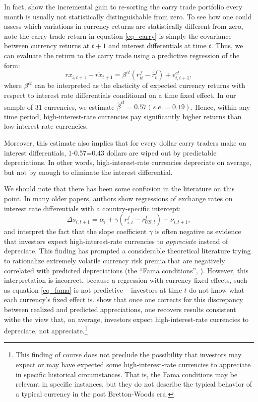 \documentclass{ar-1col}
\begin{document}
In fact, \citet{HassanMano2019} show the incremental gain to re-sorting the carry trade portfolio every month is usually not statistically distinguishable from zero. To see how one could assess which variations in currency returns are statistically different from zero, note the carry trade return in equation \ref{eq_carry} is simply the covariance between currency returns at $t+1$ and interest differentials at time $t$. Thus, we can evaluate the return to the carry trade using a predictive regression of the form:
\begin{equation}
    rx_{i,t+1} - \overline{rx}_{t+1} 
    = \beta^{ct}\left( r^f_{it}-\overline{r}^f_{t}\right) +\epsilon_{i,t+1}^{ct},  \label{eq_ct}
\end{equation} 
where $\beta ^{ct}$ can be interpreted as the elasticity of expected currency returns with respect to interest rate differentials conditional on a time fixed effect. In our sample of 31 currencies, we estimate $\hat{\beta}^{ct}=0.57 (s.e.=0.19)$. Hence, within any time period, high-interest-rate currencies pay significantly higher returns than low-interest-rate currencies.

Moreover, this estimate also implies that for every dollar carry traders make on interest differentials, 1-0.57=0.43 dollars are wiped out by predictable depreciations. In other words, high-interest-rate currencies depreciate on average, but not by enough to eliminate the interest differential.

We should note that there has been some confusion in the literature on this point. In many older papers, authors show regressions of exchange rates on interest rate differentials with a country-specific intercept:
\begin{equation}
    \Delta s_{i,t+1} 
    = \alpha_i + \gamma \left(r^f_{i, t} - r^f_{US, t}\right) + \nu_{i, t+1},
\label{eq_fama} 
\end{equation}
and interpret the fact that the slope coefficient $\gamma$ is often negative as evidence that investors expect high-interest-rate currencies to \textit{appreciate} instead of depreciate. This finding has prompted a considerable theoretical literature trying to rationalize extremely volatile currency risk premia that are negatively correlated with predicted depreciations (the ``Fama conditions'', \citet{Backusetal2001}). However, this interpretation is incorrect, because a regression with currency fixed effects, such as equation \ref{eq_fama} is not predictive -- investors at time $t$ do not know what each currency's fixed effect is. \citet{HassanMano2019} show that once one corrects for this discrepancy between realized and predicted appreciations, one recovers results consistent withe the view that, on average, investors expect high-interest-rate currencies to depreciate, not appreciate.\footnote{This finding of course does not preclude the possibility that investors may expect or may have expected some high-interest-rate currencies to appreciate in specific historical circumstances. That is, the Fama conditions may be relevant in specific instances, but they do not describe the typical behavior of a typical currency in the post Bretton-Woods era.}
\end{document}
